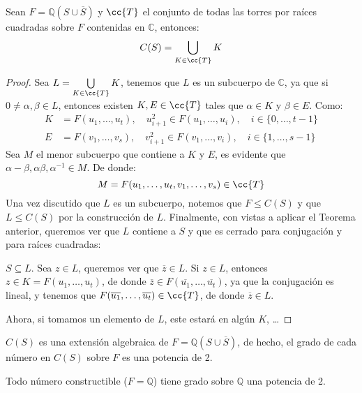 \begin{teo}
    Sean $F = \mathbb{Q}(S\cup \overline{S})$ y $\cc{T}$ el conjunto de todas las torres por raíces cuadradas sobre $F$ contenidas en $\mathbb{C}$, entonces:
    \begin{equation*}
        C(S) = \bigcup_{K\in \cc{T}}K
    \end{equation*}
    \begin{proof}
        Sea $L = \bigcup\limits_{K\in \cc{T}}K$, tenemos que $L$ es un subcuerpo de $\mathbb{C}$, ya que si $0\neq\alpha,\beta\in L$, entonces existen $K,E\in \cc{T}$ tales que $\alpha\in K$ y $\beta\in E$. Como:
            \begin{align*}
                K &= F(u_1, \ldots, u_t),\quad  u_{i+1}^2 \in F(u_1, \ldots, u_i), \quad i \in \{0,\ldots,t-1\} \\
                E &= F(v_1, \ldots, v_s),\quad  v_{i+1}^2 \in F(v_1, \ldots, v_i), \quad i \in \{1,\ldots, s-1\}
            \end{align*}
        Sea $M$ el menor subcuerpo que contiene a $K$ y $E$, es evidente que $\alpha-\beta,\alpha\beta, \alpha^{-1}\in M$. De donde:
        \begin{equation*}
            M = F(u_1,\ldots,u_t, v_1,\ldots,v_s) \in \cc{T}
        \end{equation*}
        Una vez discutido que $L$ es un subcuerpo, notemos que $F\leq C(S)$ y que $L\leq C(S)$ por la construcción de $L$. Finalmente, con vistas a aplicar el Teorema anterior, queremos ver que $L$ contiene a $S$ y que es cerrado para conjugación y para raíces cuadradas:

        $S\subseteq L$. Sea $z\in L$, queremos ver que $\overline{z}\in L$. Si $z\in L$, entonces $z\in K=F(u_1,\ldots,u_t)$, de donde $\overline{z}\in F(\overline{u_1},\ldots,\overline{u_t})$, ya que la conjugación es lineal, y tenemos que $F(\overline{u_1},\ldots,\overline{u_t})\in \cc{T}$, de donde $\overline{z}\in L$.

        Ahora, si tomamos un elemento de $L$, este estará en algún $K$, \ldots %
    \end{proof}
\end{teo}

\begin{coro}
    $C(S)$ es una extensión algebraica de $F=\mathbb{Q}(S\cup \overline{S})$, de hecho, el grado de cada número en $C(S)$ sobre $F$ es una potencia de 2. 
\end{coro}

\begin{coro}
    Todo número constructible ($F=\mathbb{Q}$) tiene grado sobre $\mathbb{Q}$ una potencia de 2.
\end{coro}


